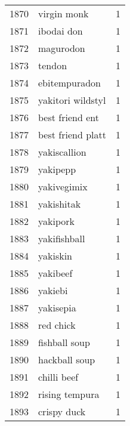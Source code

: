 \begin{tabular}{llr}
1870 &                                        virgin monk &      1 \\
1871 &                                         ibodai don &      1 \\
1872 &                                          magurodon &      1 \\
1873 &                                             tendon &      1 \\
1874 &                                      ebitempuradon &      1 \\
1875 &                                  yakitori wildstyl &      1 \\
1876 &                                    best friend ent &      1 \\
1877 &                                  best friend platt &      1 \\
1878 &                                       yakiscallion &      1 \\
1879 &                                           yakipepp &      1 \\
1880 &                                        yakivegimix &      1 \\
1881 &                                         yakishitak &      1 \\
1882 &                                           yakipork &      1 \\
1883 &                                       yakifishball &      1 \\
1884 &                                           yakiskin &      1 \\
1885 &                                           yakibeef &      1 \\
1886 &                                            yakiebi &      1 \\
1887 &                                          yakisepia &      1 \\
1888 &                                          red chick &      1 \\
1889 &                                      fishball soup &      1 \\
1890 &                                      hackball soup &      1 \\
1891 &                                        chilli beef &      1 \\
1892 &                                     rising tempura &      1 \\
1893 &                                        crispy duck &      1 \\

\end{tabular}
